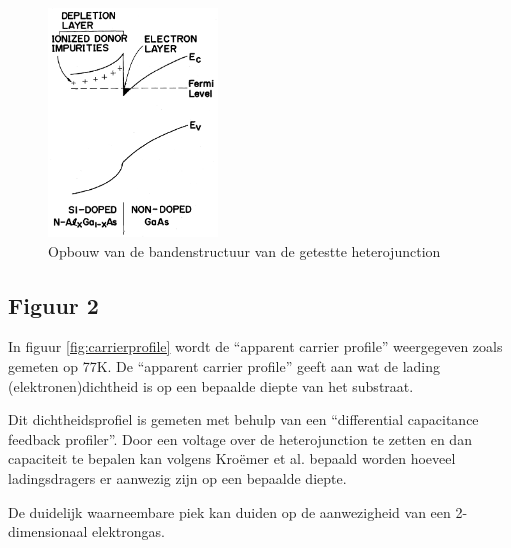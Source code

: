 \documentclass[11pt]{article}
\begin{document}
\begin{figure}[h]
  \begin{center}
    \includegraphics[width=0.4\textwidth]{bandenergy_structure.png}
    \caption{Opbouw van de bandenstructuur van de getestte heterojunction}
    \label{fig:band_structure}
  \end{center}
\end{figure}

\newpage

\subsection{Figuur 2}
In figuur \ref{fig:carrierprofile} wordt de ``apparent carrier profile'' weergegeven zoals gemeten op 77K. De ``apparent carrier profile'' geeft aan wat de lading (elektronen)dichtheid is op een bepaalde diepte van het substraat.

Dit dichtheidsprofiel is gemeten met behulp van een ``differential capacitance feedback profiler''. Door een voltage over de heterojunction te zetten en dan capaciteit te bepalen kan volgens Kro\"emer et al. bepaald worden hoeveel ladingsdragers er aanwezig zijn op een bepaalde diepte.

De duidelijk waarneembare piek kan duiden op de aanwezigheid van een 2-dimensionaal elektrongas.
\end{document}
